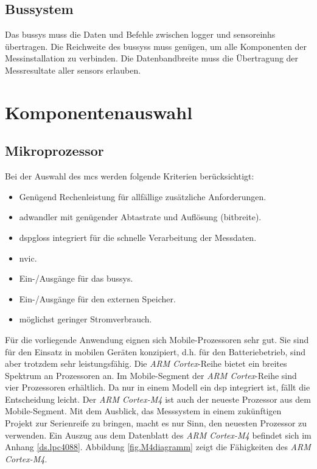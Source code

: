 \subsection{Bussystem}
Das \gls{bussys} muss die Daten und Befehle zwischen \gls{logger} und \glspl{sensoreinh} übertragen. Die Reichweite des \gls{bussys}s muss genügen, um alle Komponenten der Messinstallation zu verbinden. Die Datenbandbreite muss die Übertragung der Messresultate aller \glspl{sensor} erlauben.


\section{Komponentenauswahl}

\subsection{Mikroprozessor}
Bei der Auswahl des \gls{mc}s werden folgende Kriterien berücksichtigt:

\begin{itemize}
\item Genügend Rechenleistung für allfällige zusätzliche Anforderungen.
\item \gls{adwandler} mit genügender Abtastrate und Auflösung (\gls{bitbreite}).
\item \gls{dspgloss} integriert für die schnelle Verarbeitung der Messdaten.
\item \gls{nvic}.
\item Ein-/Ausgänge für das \gls{bussys}.
\item Ein-/Ausgänge für den externen Speicher.
\item möglichst geringer Stromverbrauch.
\end{itemize}

Für die vorliegende Anwendung eignen sich Mobile-Prozessoren sehr gut. Sie sind für den Einsatz in mobilen Geräten konzipiert, d.h. für den Batteriebetrieb, sind aber trotzdem sehr leistungsfähig. Die \emph{ARM Cortex}-Reihe bietet ein breites Spektrum an Prozessoren an. Im Mobile-Segment der \emph{ARM Cortex}-Reihe sind vier Prozessoren erhältlich. Da nur in einem Modell ein \gls{dsp} integriert ist, fällt die Entscheidung leicht. Der \emph{ARM Cortex-M4} ist auch der neueste Prozessor aus dem Mobile-Segment. Mit dem Ausblick, das Messsystem in einem zukünftigen Projekt zur Serienreife zu bringen, macht es nur Sinn, den neuesten Prozessor zu verwenden. Ein Auszug aus dem Datenblatt des \emph{ARM Cortex-M4} befindet sich im Anhang \ref{ds.lpc4088}. Abbildung \ref{fig.M4diagramm} zeigt die Fähigkeiten des \emph{ARM Cortex-M4}.

